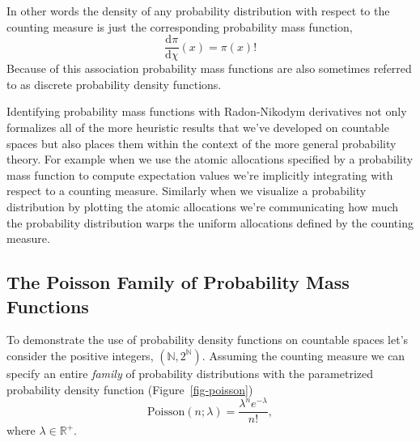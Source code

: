 \documentclass[
  letterpaper,
  DIV=11,
  numbers=noendperiod]{scrartcl}
\begin{document}
In other words the density of any probability distribution with respect
to the counting measure is just the corresponding probability mass
function, \[
\frac{ \mathrm{d} \pi }{ \mathrm{d} \chi }(x) = \pi(x)!
\] Because of this association probability mass functions are also
sometimes referred to as discrete probability density functions.

Identifying probability mass functions with Radon-Nikodym derivatives
not only formalizes all of the more heuristic results that we've
developed on countable spaces but also places them within the context of
the more general probability theory. For example when we use the atomic
allocations specified by a probability mass function to compute
expectation values we're implicitly integrating with respect to a
counting measure. Similarly when we visualize a probability distribution
by plotting the atomic allocations we're communicating how much the
probability distribution warps the uniform allocations defined by the
counting measure.

\hypertarget{the-poisson-family-of-probability-mass-functions}{%
\subsection{The Poisson Family of Probability Mass
Functions}\label{the-poisson-family-of-probability-mass-functions}}

To demonstrate the use of probability density functions on countable
spaces let's consider the positive integers,
\((\mathbb{N}, 2^{\mathbb{N}})\). Assuming the counting measure we can
specify an entire \emph{family} of probability distributions with the
parametrized probability density function (Figure~\ref{fig-poisson}) \[
\mathrm{Poisson}(n; \lambda) = \frac{ \lambda^{n} e^{-\lambda} }{ n! },
\] where \(\lambda \in \mathbb{R}^{+}\).
\end{document}
